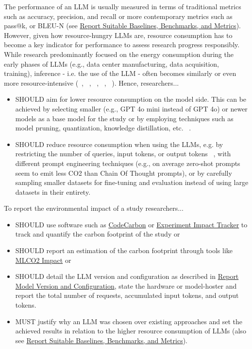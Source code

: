 The performance of an LLM is usually measured in terms of traditional metrics such as accuracy, precision, and recall or more contemporary metrics such as pass@k, or BLEU-N (see \href{/guidelines/report-baselines-benchmarks-and-metrics}{Report Suitable Baselines, Benchmarks, and Metrics}). However, given how resource-hungry LLMs are, resource consumption has to become a key indicator for performance to assess research progress responsibly. 
While research predominantly focused on the energy consumption during the early phases of LLMs (e.g., data center manufacturing, data acquisition, training), inference - i.e. the use of the LLM - often becomes similarly or even more resource-intensive (~\cite{de2023growing}, ~\cite{DBLP:conf/mlsys/WuRGAAMCBHBGGOM22}, ~\cite{DBLP:journals/corr/abs-2410-02950}, ~\cite{JIANG2024202}, ~\cite{mitu2024hidden}).
Hence, researchers...
\begin{itemize}
  \item SHOULD aim for lower resource consumption on the model side. This can be achieved by selecting smaller (e.g., GPT 4o mini instead of GPT 4o) or newer models as a base model for the study or by employing techniques such as model pruning, quantization, knowledge distillation, etc. ~\cite{mitu2024hidden}.
  \item SHOULD reduce resource consumption when using the LLMs, e.g. by restricting the number of queries, input tokens, or output tokens ~\cite{mitu2024hidden}, with different prompt engineering techniques (e.g., on average zero-shot prompts seem to emit less CO2 than Chain Of Thought prompts), or by carefully sampling smaller datasets for fine-tuning and evaluation instead of using large datasets in their entirety.
\end{itemize}
To report the environmental impact of a study researchers...
\begin{itemize}
    \item SHOULD use software such as \href{https://github.com/mlco2/codecarbon}{CodeCarbon} or \href{experiment-impact-tracker}{Experiment Impact Tracker} to track and quantify the carbon footprint of the study or
    \item SHOULD report an estimation of the carbon footprint through tools like \href{https://mlco2.github.io/impact/#about}{MLCO2 Impact} or
    \item SHOULD detail the LLM version and configuration as described in \href{/guidelines/report-version-and-configuration}{Report Model Version and Configuration}, state the hardware or model-hoster and report the total number of requests, accumulated input tokens, and output tokens.
    \item MUST justify why an LLM was chosen over existing approaches and set the achieved results in relation to the higher resource consumption of LLMs (also see \href{/guidelines/report-baselines-benchmarks-and-metrics}{Report Suitable Baselines, Benchmarks, and Metrics}).
\end{itemize}

